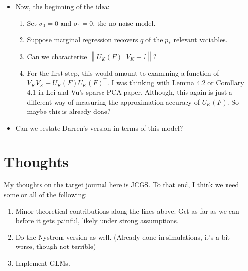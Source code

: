\documentclass[11pt]{article}
\newcommand{\norm}[1]{\left\lVert #1 \right\rVert}
\begin{document}
\begin{itemize}
\item Now, the beginning of the idea:
\begin{enumerate}
\item Set $\sigma_0=0$ and $\sigma_1=0$, the no-noise model.
\item Suppose marginal regression recovers $q$ of the $p_*$ relevant
  variables.
\item Can we characterize $\norm{U_K(F)^\top V_K - I}$?
\item For the first step, this would amount to examining a function of
  $V_KV_K^\top-U_K(F)U_K(F)^\top$. I was thinking with Lemma 4.2 or
  Corollary 4.1 in Lei and Vu's sparse PCA paper. Although, this again
  is just a different way of measuring the approximation accuracy of
  $U_K(F)$. So maybe this is already done?
\end{enumerate}
\item Can we restate Darren's version in terms of this model?
\end{itemize}

\section{Thoughts}
My thoughts on the target journal here is JCGS. To that end, I
think we need some or all of the following:
\begin{enumerate}
\item Minor theoretical contributions along the lines above. Get as
  far as we can before it gets painful, likely under strong assumptions.
\item Do the Nystrom version as well. (Already done in simulations,
  it's a bit worse, though not terrible)
\item Implement GLMs.
\end{enumerate}







\end{document}
